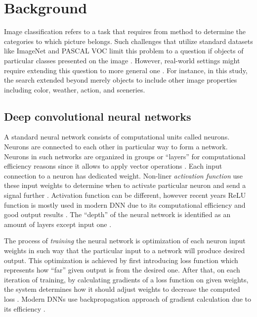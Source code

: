 \chapter{Background}
\label{chap:background}
Image classification refers to a task that requires from method to determine the categories to which picture belongs. Such challenges that utilize standard datasets like ImageNet and PASCAL VOC limit this problem to a question if objects of particular classes presented on the image \cite{Russakovsky2015ImageNet, Everingham2010PASCAL-VOC}. However, real-world settings might require extending this question to more general one \cite{Wang2016CNN-RNN:Classification}. For instance, in this study, the search extended beyond merely objects to include other image properties including color, weather, action, and sceneries. %


\section{Deep convolutional neural networks}

A standard neural network consists of computational units called neurons. Neurons are connected to each other in particular way to form a network. Neurons in such networks are organized in groups or ``layers'' for computational efficiency reasons since it allows to apply vector operations \cite{cs231n-nn1}.  Each input connection to a neuron has dedicated weight. Non-liner \textit{activation function} use these input weights to determine when to activate particular neuron and send a signal further \cite{Schmidhuber2015DeepOverview}. Activation function can be different, however recent years ReLU function is mostly used in modern DNN due to its computational efficiency and good output results \cite{relu, Krizhevsky2012ImageNetDNN}. The ``depth'' of the neural network is identified as an amount of layers except input one \cite{Schmidhuber2015DeepOverview}.

The process of \textit{training} the neural network is optimization of each neuron input weights in such way that the particular input to a network will produce desired output. This optimization is achieved by first introducing loss function which represents how ``far'' given output is from the desired one. After that, on each iteration of training, by calculating gradients of a loss function on given weights, the system determines how it should adjust weights to decrease the computed loss \cite{cs231n-opt1}. Modern DNNs use backpropagation approach of gradient calculation due to its efficiency \cite{cs231n-opt2}. 

